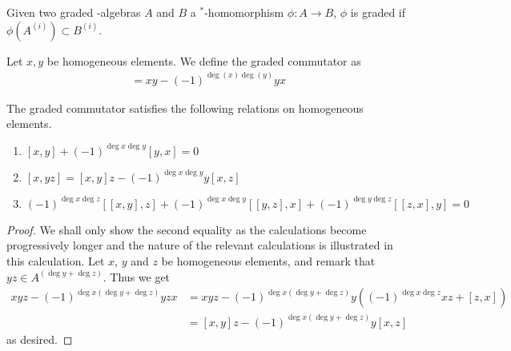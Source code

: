 \begin{definition}
	Given two graded \Cstar-algebras $A$ and $B$ a $^*$-homomorphism $\phi:A\to B$, $\phi$ is graded if $\phi(A^{(i)})\subset B^{(i)}$. 
\end{definition}
\begin{definition}
	Let $x,y$ be homogeneous elements. We define the graded commutator as 
	\begin{align*}
		[x,y]=xy-(-1)^{\deg(x)\deg(y)}yx
	\end{align*}
\end{definition}
\begin{proposition}
The graded commutator satisfies the following relations on homogeneous elements. 
\begin{enumerate}
	\item
		$[x,y]+(-1)^{\deg x\deg y}[y,x]=0$
	\item
		$[x,yz]=[x,y]z-(-1)^{\deg x \deg y}y[x,z]$
	\item
		$(-1)^{\deg x \deg z}[[x,y],z]+(-1)^{\deg x \deg y}[[y,z],x]+(-1)^{\deg y \deg z}[[z,x],y]=0$
\end{enumerate}
\end{proposition}
\begin{proof}
We shall only show the second equality as the calculations become progressively longer and the nature of the relevant calculations is illustrated in this calculation. 
Let $x$, $y$ and $z$ be homogeneous elements, and remark that $yz\in A^{(\deg y+\deg z)}$. Thus we get
\begin{align*}
	xyz-(-1)^{\deg x (\deg y+\deg z)}yzx&=xyz-(-1)^{\deg x (\deg y+\deg z)}y((-1)^{\deg x\deg z} xz+[z,x]) \\
	&=[x,y]z-(-1)^{\deg x (\deg y+\deg z)}y[x,z]
\end{align*} 
as desired. 
\end{proof}
